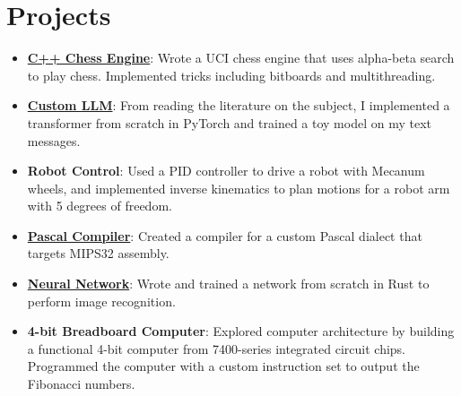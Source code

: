 \documentclass[letterpaper,12pt]{article}
\makeatletter
\newcommand{\resumeItem}[2]{
  \item\small{
    \textbf{#1}{: #2 \vspace{-2pt}}
  }
}
\newcommand{\resumeSubheading}[4]{
  \vspace{-1pt}\item
    \begin{tabular*}{0.97\textwidth}[t]{l@{\extracolsep{\fill}}r}
      \textbf{#1} & #2 \\
      \textit{\small#3} & \textit{\small #4} \\
    \end{tabular*}\vspace{-5pt}
}
\newcommand{\resumeSubSubheading}[2]{
    \begin{tabular*}{0.97\textwidth}{l@{\extracolsep{\fill}}r}
      \textit{\small#1} & \textit{\small #2} \\
    \end{tabular*}\vspace{-5pt}
}
\newcommand{\resumeSubItem}[2]{\resumeItem{#1}{#2}\vspace{-4pt}}
\newcommand{\resumeSubHeadingListStart}{\begin{itemize}[leftmargin=*]}
\newcommand{\resumeSubHeadingListEnd}{\end{itemize}}
\newcommand{\resumeItemListStart}{\begin{itemize}}
\newcommand{\resumeItemListEnd}{\end{itemize}\vspace{-5pt}}
\makeatother
\begin{document}
\section{Projects}
  \resumeSubHeadingListStart
  \resumeSubItem{\href{https://github.com/ROTARTSI82/chess}{C++ Chess Engine}}{Wrote a UCI chess engine that uses alpha-beta search to play chess. Implemented tricks including bitboards and multithreading.}
      \resumeSubItem{\href{https://github.com/ROTARTSI82/ATCS/tree/ATNeural/chessnn/llm}{Custom LLM}}
      {From reading the literature on the subject, I implemented a transformer from scratch in PyTorch and trained a toy model on my text messages.}
    \resumeSubItem{Robot Control}{Used a PID controller to drive a robot with Mecanum wheels, and implemented inverse kinematics to plan motions for a robot arm with 5 degrees of freedom.}
    \resumeSubItem{\href{https://github.com/ROTARTSI82/ATCS/tree/ATCompilers}{Pascal Compiler}}
      {Created a compiler for a custom Pascal dialect that targets MIPS32 assembly.}
    \resumeSubItem{\href{https://github.com/ROTARTSI82/ATCS}{Neural Network}}
      {Wrote and trained a network from scratch in Rust to perform image recognition.}
    \resumeSubItem{4-bit Breadboard Computer}{Explored computer architecture by building a functional 4-bit computer from 7400-series integrated circuit chips. Programmed the computer with a custom instruction set to output the Fibonacci numbers.}
  \resumeSubHeadingListEnd








\end{document}
